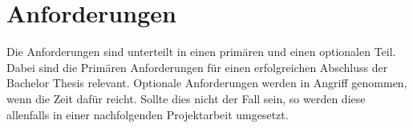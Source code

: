 \chapter{Anforderungen}
Die Anforderungen sind unterteilt in einen prim\"aren und einen optionalen Teil. Dabei sind die Prim\"aren Anforderungen f\"ur einen erfolgreichen Abschluss der Bachelor Thesis relevant. Optionale Anforderungen werden in Angriff genommen, wenn die Zeit daf\"ur reicht. Sollte dies nicht der Fall sein, so werden diese allenfalls in einer nachfolgenden Projektarbeit umgesetzt.




